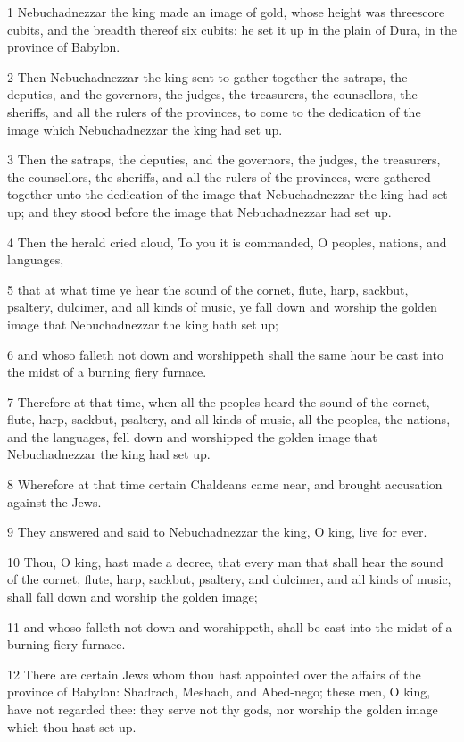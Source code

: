 \par 1 Nebuchadnezzar the king made an image of gold, whose height was threescore cubits, and the breadth thereof six cubits: he set it up in the plain of Dura, in the province of Babylon.
\par 2 Then Nebuchadnezzar the king sent to gather together the satraps, the deputies, and the governors, the judges, the treasurers, the counsellors, the sheriffs, and all the rulers of the provinces, to come to the dedication of the image which Nebuchadnezzar the king had set up.
\par 3 Then the satraps, the deputies, and the governors, the judges, the treasurers, the counsellors, the sheriffs, and all the rulers of the provinces, were gathered together unto the dedication of the image that Nebuchadnezzar the king had set up; and they stood before the image that Nebuchadnezzar had set up.
\par 4 Then the herald cried aloud, To you it is commanded, O peoples, nations, and languages,
\par 5 that at what time ye hear the sound of the cornet, flute, harp, sackbut, psaltery, dulcimer, and all kinds of music, ye fall down and worship the golden image that Nebuchadnezzar the king hath set up;
\par 6 and whoso falleth not down and worshippeth shall the same hour be cast into the midst of a burning fiery furnace.
\par 7 Therefore at that time, when all the peoples heard the sound of the cornet, flute, harp, sackbut, psaltery, and all kinds of music, all the peoples, the nations, and the languages, fell down and worshipped the golden image that Nebuchadnezzar the king had set up.
\par 8 Wherefore at that time certain Chaldeans came near, and brought accusation against the Jews.
\par 9 They answered and said to Nebuchadnezzar the king, O king, live for ever.
\par 10 Thou, O king, hast made a decree, that every man that shall hear the sound of the cornet, flute, harp, sackbut, psaltery, and dulcimer, and all kinds of music, shall fall down and worship the golden image;
\par 11 and whoso falleth not down and worshippeth, shall be cast into the midst of a burning fiery furnace.
\par 12 There are certain Jews whom thou hast appointed over the affairs of the province of Babylon: Shadrach, Meshach, and Abed-nego; these men, O king, have not regarded thee: they serve not thy gods, nor worship the golden image which thou hast set up.
